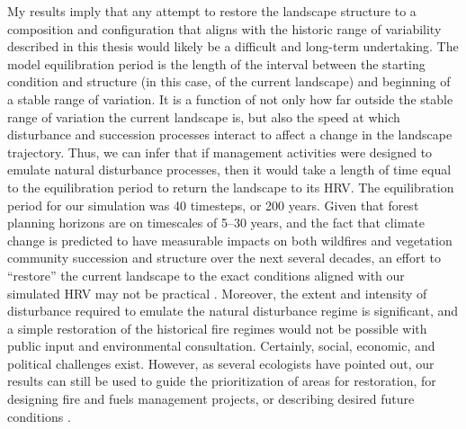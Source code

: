 
My results imply that any attempt to restore the landscape structure to a composition and configuration that aligns with the historic range of variability described in this thesis would likely be a difficult and long-term undertaking. The model equilibration period is the length of the interval between the starting condition and structure (in this case, of the current landscape) and beginning of a stable range of variation. It is a function of not only how far outside the stable range of variation the current landscape is, but also the speed at which disturbance and succession processes interact to affect a change in the landscape trajectory. Thus, we can infer that if management activities were designed to emulate natural disturbance processes, then it would take a length of time equal to the equilibration period to return the landscape to its HRV. The equilibration period for our simulation was 40 timesteps, or 200 years. Given that forest planning horizons are on timescales of 5--30 years, and the fact that climate change is predicted to have measurable impacts on both wildfires and vegetation community succession and structure over the next several decades, an effort to ``restore'' the current landscape to the exact conditions aligned with our simulated HRV may not be practical \citep{Millar1999,Millar2014}. Moreover, the extent and intensity of disturbance required to emulate the natural disturbance regime is significant, and a simple restoration of the historical fire regimes would not be possible with public input and environmental consultation. Certainly, social, economic, and political challenges exist. However, as several ecologists have pointed out, our results can still be used to guide the prioritization of areas for restoration, for designing fire and fuels management projects, or describing desired future conditions \citep{Safford2013,Keeley2000}.


